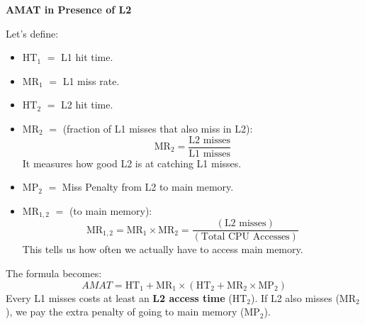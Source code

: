 \highspace
\begin{flushleft}
    \textcolor{Green3}{ \textbf{AMAT in Presence of L2}}
\end{flushleft}
Let's define:
\begin{itemize}
    \item $\text{HT}_{1}$ $=$ L1 hit time.
    \item $\text{MR}_{1}$ $=$ L1 miss rate.
    \item $\text{HT}_{2}$ $=$ L2 hit time.
    \item $\text{MR}_{2}$ $=$  (fraction of L1 misses that also miss in L2):
    \begin{equation}
        \text{MR}_{2} = \dfrac{\text{L2 misses}}{\text{L1 misses}}
    \end{equation}
    It measures how good L2 is at catching L1 misses.
    \item $\text{MP}_{2}$ $=$ Miss Penalty from L2 to main memory.
    \item $\text{MR}_{1,2}$ $=$  (to main memory):
    \begin{equation}
        \text{MR}_{1,2} = \text{MR}_{1} \times \text{MR}_{2} = \dfrac{\left(\text{L2 misses}\right)}{\left(\text{Total CPU Accesses}\right)}
    \end{equation}
    This tells us how often we actually have to access main memory.
\end{itemize}
The formula becomes:
\begin{equation}
    AMAT = \text{HT}_{1} + \text{MR}_{1} \times \left(\text{HT}_{2} + \text{MR}_{2} \times \text{MP}_{2}\right)
\end{equation}
Every L1 misses costs at least an \textbf{L2 access time} ($\text{HT}_{2}$). If L2 also misses ($\text{MR}_{2}$), we pay the extra penalty of going to main memory ($\text{MP}_{2}$).

